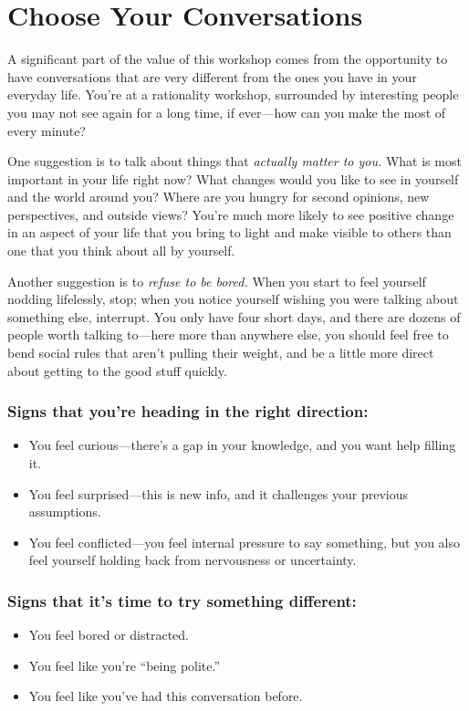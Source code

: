 \clearpage
\section*{Choose Your Conversations}

A significant part of the value of this workshop comes from the opportunity to have conversations that are very different from the ones you have in your everyday life.  You're at a rationality workshop, surrounded by interesting people you may not see again for a long time, if ever---how can you make the most of every minute?

One suggestion is to talk about things that \emph{actually matter to you.}  What is most important in your life right now?  What changes would you like to see in yourself and the world around you?  Where are you hungry for second opinions, new perspectives, and outside views?  You're much more likely to see positive change in an aspect of your life that you bring to light and make visible to others than one that you think about all by yourself.

Another suggestion is to \emph{refuse to be bored.}  When you start to feel yourself nodding lifelessly, stop; when you notice yourself wishing you were talking about something else, interrupt.  You only have four short days, and there are dozens of people worth talking to---here more than anywhere else, you should feel free to bend social rules that aren't pulling their weight, and be a little more direct about getting to the good stuff quickly.

\subsubsection{Signs that you're heading in the right direction:}
\begin{itemize}
	\item You feel curious---there's a gap in your knowledge, and you want help filling it.
	\item You feel surprised---this is new info, and it challenges your previous assumptions.
	\item You feel conflicted---you feel internal pressure to say something, but you also feel yourself holding back from nervousness or uncertainty.
\end{itemize}

\subsubsection{Signs that it's time to try something different:}
\begin{itemize}
	\item You feel bored or distracted.
	\item You feel like you're ``being polite.''
	\item You feel like you've had this conversation before.
\end{itemize}

